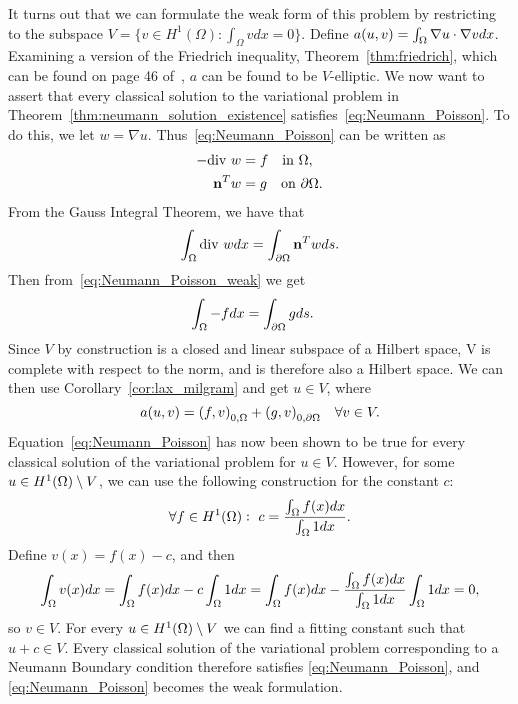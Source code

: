 It turns out that we can formulate the weak form of this problem by restricting to the subspace $V=\{v\in H^1(\Omega):\int_{\Omega}vdx=0\}$.
Define $a(u,v) = \int_\Omega \nabla u \cdot \nabla v dx$. Examining a version of 
the Friedrich inequality, Theorem~\ref{thm:friedrich}, which can be found on 
page 46 of~\cite{Braess}, $a$ can be found to be $V$-elliptic.
We now want to assert that every classical solution to the variational problem in Theorem~\ref{thm:neumann_solution_existence} satisfies~\eqref{eq:Neumann_Poisson}.
To do this, we let $w=\nabla u$. Thus~\eqref{eq:Neumann_Poisson} can be written as
\begin{align}\label{eq:Neumann_Poisson_weak}
\begin{split}
    -\text{div } w &= f \quad \text{in } \Omega, \\
    \mathbf{n}^T w &= g \quad \text{on } \partial \Omega.
\end{split}    
\end{align}
From the Gauss Integral Theorem, we have that
\[\int_{\Omega} \text{div } w dx = \int_{\partial \Omega} \mathbf{n}^T w ds.\]
Then from~\eqref{eq:Neumann_Poisson_weak} we get
\begin{align}
\begin{split}
\int_{\Omega} -f dx &= \int_{\partial \Omega} g ds.
\end{split}
\end{align}
Since $V$ by construction is a closed and linear subspace of a Hilbert space, 
V is complete with respect to the norm, and is therefore also a Hilbert space. 
We can then use Corollary~\ref{cor:lax_milgram} 
 and get $u\in V$, where %
\begin{equation}\label{eq:Lax-Milgram_Neumann}
  a(u,v) = {(f,v)}_{0,\Omega} + {(g,v)}_{0,\partial \Omega} \quad \forall v\in V.  
\end{equation}
Equation~\eqref{eq:Neumann_Poisson} has now been shown to be true for 
every classical solution of the variational problem for $u\in V$. However, for some 
$u\in H^1(\Omega)\setminus V$, we can use the following construction for 
the constant $c$:
\begin{equation*}
    \forall f \in H^1(\Omega): \,\, c = \frac{\int_\Omega f(x) dx }{\int_\Omega 1 dx}.
\end{equation*}
Define $v(x) = f(x) - c$, and then 
\begin{equation*}
    \int_\Omega v(x)dx = \int_\Omega f(x) dx - c\int_\Omega 1 dx = \int_\Omega f(x) dx - \frac{\int_\Omega f(x) dx }{\int_\Omega 1 dx} \int_\Omega 1 dx = 0,
\end{equation*}
so $v \in V$. For every $u\in H^1(\Omega)\setminus V$ we can find a fitting 
constant such that $u+c \in V$. Every classical solution of the 
variational problem corresponding to a Neumann Boundary condition therefore 
satisfies \eqref{eq:Neumann_Poisson}, and \eqref{eq:Neumann_Poisson} becomes the weak formulation.